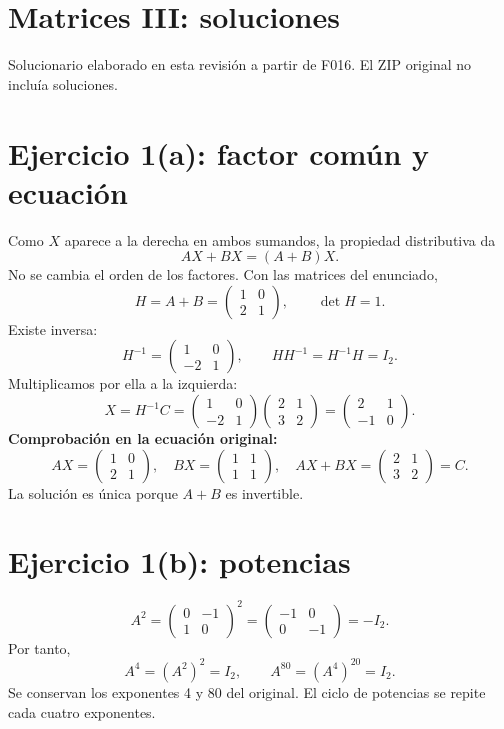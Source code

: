 \documentclass[11pt]{article}
\begin{document}
\section*{Matrices III: soluciones}
Solucionario elaborado en esta revisión a partir de F016. El ZIP original no incluía soluciones.
\section*{Ejercicio 1(a): factor común y ecuación}
Como $X$ aparece a la derecha en ambos sumandos, la propiedad distributiva da
\[AX+BX=(A+B)X.\]
No se cambia el orden de los factores. Con las matrices del enunciado,
\[
H=A+B=\begin{pmatrix}1&0\\2&1\end{pmatrix},\qquad\det H=1.
\]
Existe inversa:
\[
H^{-1}=\begin{pmatrix}1&0\\-2&1\end{pmatrix},\qquad
HH^{-1}=H^{-1}H=I_2.
\]
Multiplicamos por ella a la izquierda:
\[
X=H^{-1}C=\begin{pmatrix}1&0\\-2&1\end{pmatrix}
\begin{pmatrix}2&1\\3&2\end{pmatrix}
=\boxed{\begin{pmatrix}2&1\\-1&0\end{pmatrix}}.
\]
\textbf{Comprobación en la ecuación original:}
\[
AX=\begin{pmatrix}1&0\\2&1\end{pmatrix},\quad
BX=\begin{pmatrix}1&1\\1&1\end{pmatrix},\quad
AX+BX=\begin{pmatrix}2&1\\3&2\end{pmatrix}=C.
\]
La solución es única porque $A+B$ es invertible.
\section*{Ejercicio 1(b): potencias}
\[
A^2=\begin{pmatrix}0&-1\\1&0\end{pmatrix}^2
=\begin{pmatrix}-1&0\\0&-1\end{pmatrix}=-I_2.
\]
Por tanto,
\[
\boxed{A^4=(A^2)^2=I_2},\qquad
\boxed{A^{80}=(A^4)^{20}=I_2}.
\]
Se conservan los exponentes 4 y 80 del original. El ciclo de potencias se repite cada cuatro exponentes.
\clearpage
\end{document}
